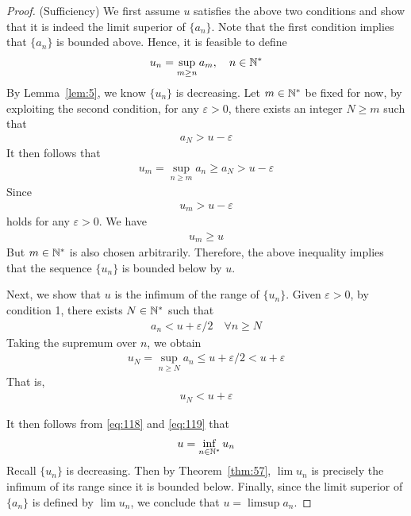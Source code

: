 \documentclass[thmcnt=section, 12pt]{my-elegantbook}
\begin{document}
\begin{proof}
    (Sufficiency) We first assume $u$ satisfies the above two conditions and show that it is indeed the limit superior of $\{a_n\}$. Note that the first condition implies that $\{a_n\}$ is bounded above. Hence, it is feasible to define 
    \begin{align*}
        u_n = \sup_{m \geq n} a_m,
        \quad n \in \mathbb{N}^\ast
    \end{align*}
    By Lemma~\ref{lem:5}, we know $\{u_n\}$ is decreasing. Let $m \in \mathbb{N}^\ast$ be fixed for now, by exploiting the second condition, for any $\varepsilon > 0$, there exists an integer $N \geq m$ such that 
    \begin{align*}
        a_N > u - \varepsilon
    \end{align*}
    It then follows that 
    \begin{align*}
        u_m = \sup_{n \geq m} a_n
        \geq a_N
        > u - \varepsilon
    \end{align*}
    Since 
    \begin{align*}
        u_m > u - \varepsilon
    \end{align*}
    holds for any $\varepsilon > 0$. We have 
    \begin{align}
        u_m \geq u
        \label{eq:118}
    \end{align}
    But $m \in \mathbb{N}^\ast$ is also chosen arbitrarily. Therefore, the above inequality implies that the sequence $\{u_n\}$ is bounded below by $u$.

    Next, we show that $u$ is the infimum of the range of $\{u_n\}$. Given $\varepsilon > 0$, by condition 1, there exists $N \in \mathbb{N}^\ast$ such that 
    \begin{align*}
        a_n < u + \varepsilon/2
        \quad \forall n \geq N
    \end{align*}
    Taking the supremum over $n$, we obtain 
    \begin{align*}
        u_N = \sup_{n \geq N} a_n 
        \leq u + \varepsilon/2
        < u + \varepsilon
    \end{align*}
    That is, 
    \begin{align}
        u_N < u + \varepsilon
        \label{eq:119}
    \end{align}

    It then follows from \eqref{eq:118} and \eqref{eq:119} that
    \begin{align*}
        u = \inf_{n \in \mathbb{N}^\ast} u_n
    \end{align*} 
    Recall $\{u_n\}$ is decreasing. Then by Theorem~\ref{thm:57}, $\lim u_n$ is precisely the infimum of its range since it is bounded below. Finally, since the limit superior of $\{a_n\}$ is defined by $\lim u_n$, we conclude that $u = \limsup a_n$.


\end{proof}
\end{document}
